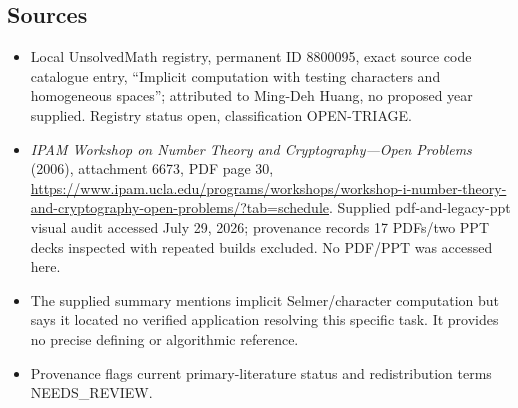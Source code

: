 \documentclass[11pt]{article}
\begin{document}
\subsection{Sources}
\begin{itemize}
\item Local UnsolvedMath registry, permanent ID 8800095, exact source code catalogue entry, ``Implicit computation with testing characters and homogeneous spaces''; attributed to Ming-Deh Huang, no proposed year supplied. Registry status open, classification OPEN-TRIAGE.
\item \emph{IPAM Workshop on Number Theory and Cryptography---Open Problems} (2006), attachment 6673, PDF page 30, \url{https://www.ipam.ucla.edu/programs/workshops/workshop-i-number-theory-and-cryptography-open-problems/?tab=schedule}. Supplied pdf-and-legacy-ppt visual audit accessed July 29, 2026; provenance records 17 PDFs/two PPT decks inspected with repeated builds excluded. No PDF/PPT was accessed here.
\item The supplied summary mentions implicit Selmer/character computation but says it located no verified application resolving this specific task. It provides no precise defining or algorithmic reference.
\item Provenance flags current primary-literature status and redistribution terms NEEDS\_REVIEW.
\end{itemize}
\end{document}
